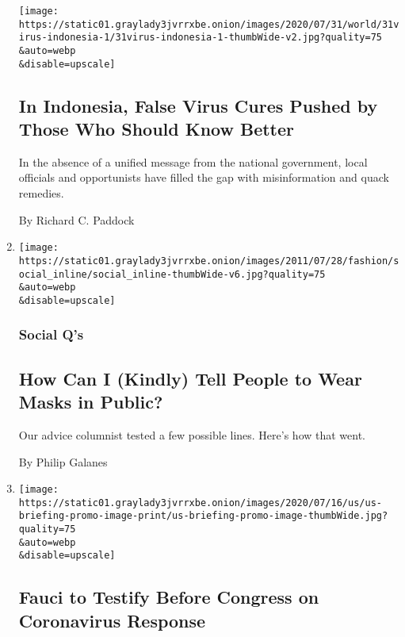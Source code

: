 \begin{enumerate}
  \texttt{[image: https://static01.graylady3jvrrxbe.onion/images/2020/07/31/world/31virus-indonesia-1/31virus-indonesia-1-thumbWide-v2.jpg?quality=75\\\&auto=webp\\\&disable=upscale]}

  \hypertarget{in-indonesia-false-virus-cures-pushed-by-those-who-should-know-better}{%
  \subsection{In Indonesia, False Virus Cures Pushed by Those Who Should
  Know
  Better}\label{in-indonesia-false-virus-cures-pushed-by-those-who-should-know-better}}

  In the absence of a unified message from the national government,
  local officials and opportunists have filled the gap with
  misinformation and quack remedies.

  By Richard C. Paddock
\item
  \href{/2020/07/30/style/masks-in-public-coronavirus.html}{}

  \texttt{[image: https://static01.graylady3jvrrxbe.onion/images/2011/07/28/fashion/social\_inline/social\_inline-thumbWide-v6.jpg?quality=75\\\&auto=webp\\\&disable=upscale]}

  \hypertarget{social-qs}{%
  \subsubsection{Social Q's}\label{social-qs}}

  \hypertarget{how-can-i-kindly-tell-people-to-wear-masks-in-public}{%
  \subsection{How Can I (Kindly) Tell People to Wear Masks in
  Public?}\label{how-can-i-kindly-tell-people-to-wear-masks-in-public}}

  Our advice columnist tested a few possible lines. Here's how that
  went.

  By Philip Galanes
\item
  \href{/2020/07/30/world/coronavirus-covid-19.html}{}

  \texttt{[image: https://static01.graylady3jvrrxbe.onion/images/2020/07/16/us/us-briefing-promo-image-print/us-briefing-promo-image-thumbWide.jpg?quality=75\\\&auto=webp\\\&disable=upscale]}

  \hypertarget{fauci-to-testify-before-congress-on-coronavirus-response}{%
  \subsection{Fauci to Testify Before Congress on Coronavirus
  Response}\label{fauci-to-testify-before-congress-on-coronavirus-response}}


\end{enumerate}
